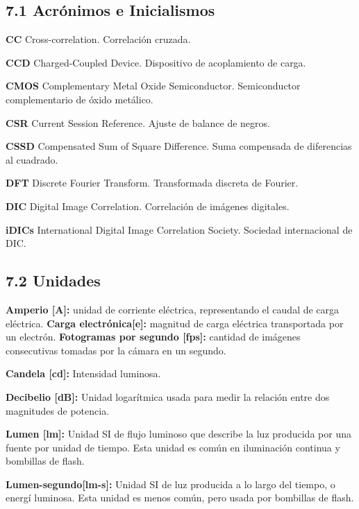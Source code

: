 \documentclass{article}
\begin{document}
\subsection*{7.1 Acr\'onimos e Inicialismos}

\noindent\textbf{CC} Cross-correlation. Correlaci\'on cruzada.

\noindent\textbf{CCD} Charged-Coupled Device. Dispositivo de acoplamiento de carga.

\noindent\textbf{CMOS} Complementary Metal Oxide Semiconductor. Semiconductor complementario de \'oxido met\'alico.

\noindent\textbf{CSR} Current Session Reference. Ajuste de balance de negros.

\noindent\textbf{CSSD} Compensated Sum of Square Difference. Suma compensada de diferencias al cuadrado.

\noindent\textbf{DFT} Discrete Fourier Transform. Transformada discreta de Fourier.

\noindent\textbf{DIC} Digital Image Correlation. Correlaci\'on de im\'agenes digitales.

\noindent\textbf{iDICs} International Digital Image Correlation Society. Sociedad internacional de DIC.

\subsection*{7.2 Unidades}

\noindent\textbf{Amperio [A]:} unidad de corriente el\'ectrica, representando el caudal de carga el\'ectrica.
\newline
\noindent\textbf{Carga electr\'onica[e]:} magnitud de carga el\'ectrica transportada por un electr\'on.
\newline
\noindent\textbf{Fotogramas por segundo [fps]:} cantidad de im\'agenes consecutivas tomadas por la c\'amara en un segundo.

\noindent\textbf{Candela [cd]:} Intensidad luminosa.

\noindent\textbf{Decibelio [dB]:} Unidad logar\'itmica usada para medir la relaci\'on entre dos magnitudes de potencia.

\noindent\textbf{Lumen [lm]:} Unidad SI de flujo luminoso que describe la luz producida por una fuente por unidad de tiempo. Esta unidad es com\'un en iluminaci\'on continua y bombillas de flash.

\noindent\textbf{Lumen-segundo[lm-s]:} Unidad SI de luz producida a lo largo del tiempo, o energ\'i luminosa. Esta unidad es menos com\'un, pero usada por bombillas de flash.
\end{document}
